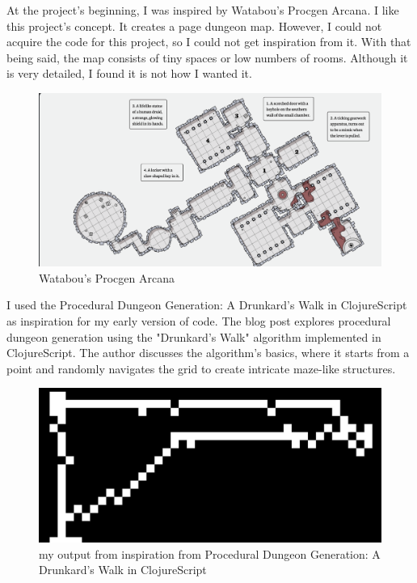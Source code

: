 \documentclass[10pt,twocolumn]{article}
\begin{document}
At the project's beginning, I was inspired by Watabou's Procgen Arcana\cite{watabou_dungeon}. I like this project's concept. It creates a page dungeon map. However, I could not acquire the code for this project, so I could not get inspiration from it. With that being said, the map consists of tiny spaces or low numbers of rooms. Although it is very detailed, I found it is not how I wanted it.
\begin{figure}
    \centering
    \includegraphics[width=0.5\linewidth]{watab.png}
    \caption{Watabou's Procgen Arcana}
    \label{fig:enter-label}
\end{figure}
I used the Procedural Dungeon Generation: A Drunkard's Walk in ClojureScript as inspiration for my early version of code. The blog post explores procedural dungeon generation using the "Drunkard's Walk" algorithm implemented in ClojureScript. The author discusses the algorithm's basics, where it starts from a point and randomly navigates the grid to create intricate maze-like structures. \cite{jrheard_dungeon_clojurescript}

\begin{figure}
    \centering
    \includegraphics[width=0.5\linewidth]{mine.png}
    \caption{my output from inspiration from Procedural Dungeon Generation: A Drunkard's Walk in ClojureScript}
    \label{fig:enter-label}
\end{figure}
\end{document}
